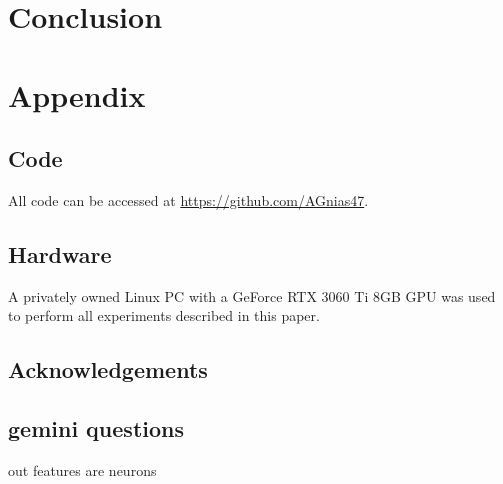 \documentclass[11pt,letterpaper,oneside,titlepage]{article}
\begin{document}
\section{Conclusion}


\newpage

\printbibliography

\newpage

\section{Appendix}

\subsection{Code}

All code can be accessed at \href{https://github.com/AGnias47}{https://github.com/AGnias47}.


\subsection{Hardware}

A privately owned Linux PC with a GeForce RTX 3060 Ti 8GB GPU was used to perform all experiments described in this paper.

\subsection{Acknowledgements}


\subsection{gemini questions}

out features are neurons
\end{document}
